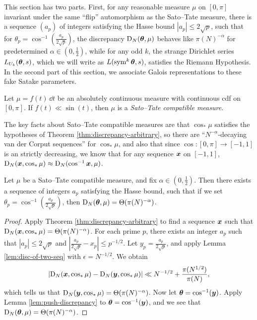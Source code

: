 This section has two parts. First, for any reasonable measure $\mu$ on 
$[0,\pi]$ invariant under the same ``flip'' automorphism as the Sato--Tate 
measure, there is a sequence $(a_p)$ of integers satisfying the Hasse 
bound $|a_p|\leqslant 2\sqrt p$, such that for 
$\theta_p = \cos^{-1}\left(\frac{a_p}{2\sqrt p}\right)$, the discrepancy 
$\operatorname{D}_N({\boldsymbol\theta},\mu)$ behaves like $\pi(N)^{-\alpha}$ for predetermined 
$\alpha\in \left(0,\frac 1 2\right)$, while for any odd $k$, the strange 
Dirichlet series $L_{U_k}({\boldsymbol\theta},s)$, which we will write as 
$L(\operatorname{sym}^k {\boldsymbol\theta},s)$, satisfies the Riemann Hypothesis. In the second part of 
this section, we associate Galois representations to these fake Satake 
parameters. 

\begin{definition}
Let $\mu = f(t)\, \dd t$ be an absolutely continuous measure with continuous 
cdf on $[0,\pi]$. If $f(t) \ll \sin(t)$, then $\mu$ is a \emph{Sato--Tate compatible measure}. 
\end{definition}

The key facts about Sato--Tate compatible measures are that $\cos_\ast\mu$ 
satisfies the hypotheses of Theorem \ref{thm:discrepancy-arbitrary}, so 
there are ``$N^{-\alpha}$-decaying van der Corput sequences'' for 
$\cos_\ast\mu$, and also that since $\cos\colon [0,\pi] \to [-1,1]$ is an 
strictly decreasing, we know that for any sequence ${\boldsymbol x}$ on $[-1,1]$, 
$\operatorname{D}_N({\boldsymbol x},\cos_\ast\mu) \approx \operatorname{D}_N(\cos^{-1}{\boldsymbol x},\mu)$. 


\begin{theorem}\label{thm:integral-a_p-alpha}
Let $\mu$ be a Sato--Tate compatible measure, and fix 
$\alpha\in \left(0,\frac 1 2\right)$. 
Then there exists a sequence of integers $a_p$ satisfying the Hasse bound, 
such that if we set $\theta_p = \cos^{-1}\left(\frac{a_p}{2\sqrt p}\right)$, 
then $\operatorname{D}_N({\boldsymbol\theta},\mu) = \Theta(\pi(N)^{-\alpha})$. 
\end{theorem}
\begin{proof}
Apply Theorem \ref{thm:discrepancy-arbitrary} to find a sequence ${\boldsymbol x}$ such 
that $\operatorname{D}_N({\boldsymbol x},\cos_\ast \mu) = \Theta(\pi(N)^{-\alpha})$. For each prime 
$p$, there exists an integer $a_p$ such that $|a_p|\leqslant 2\sqrt p$ and 
$\left| \frac{a_p}{2\sqrt p} - x_p\right| \leqslant p^{-1/2}$. Let 
$y_p = \frac{a_p}{2\sqrt p}$, and apply Lemma \ref{lem:disc-of-two-seq} with 
$\epsilon = N^{-1/2}$. We obtain 
\[
	\left| \operatorname{D}_N({\boldsymbol x},\cos_\ast \mu) - \operatorname{D}_N({\boldsymbol y}, \cos_\ast \mu)\right| \ll  N^{-1/2} + \frac{\pi(N^{1/2})}{\pi(N)} ,
\]
which tells us that $\operatorname{D}_N({\boldsymbol y},\cos_\ast\mu) = \Theta(\pi(N)^{-\alpha})$. 
Now let ${\boldsymbol\theta} = \cos^{-1}({\boldsymbol y})$. Apply Lemma \ref{lem:push-discrepancy} to 
${\boldsymbol\theta} = \cos^{-1}({\boldsymbol y})$, and we see that 
$\operatorname{D}_N({\boldsymbol\theta},\mu) = \Theta(\pi(N)^{-\alpha})$. 
\end{proof}


